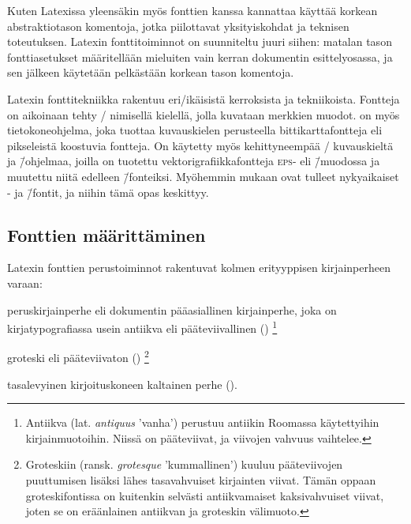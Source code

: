 Kuten Latexissa yleensäkin myös fonttien kanssa kannattaa käyttää
korkean abstraktiotason komentoja, jotka piilottavat yksityiskohdat ja
teknisen toteutuksen. Latexin fonttitoiminnot on suunniteltu juuri
siihen: matalan tason fonttiasetukset määritellään mieluiten vain kerran
dokumentin esittelyosassa, ja sen jälkeen käytetään pelkästään korkean
tason komentoja.

Latexin fonttitekniikka rakentuu eri\-/ikäisistä kerroksista ja
tekniikoista. Fontteja on aikoinaan tehty
\-/ nimisellä kielellä, jolla
kuvataan merkkien muodot.  on myös tietokoneohjelma,
joka tuottaa kuvauskielen perusteella bittikarttafontteja eli
pikseleistä koostuvia fontteja. On käytetty myös kehittyneempää
\-/ kuvauskieltä ja \=/ohjelmaa,
joilla on tuotettu vektorigrafiikkafontteja \textsc{eps}- eli
 \=/muodossa ja muutettu niitä
edelleen  \=/fonteiksi. Myöhemmin mukaan
ovat tulleet nykyaikaiset - ja 
\=/fontit, ja niihin tämä opas keskittyy.

\subsection{Fonttien määrittäminen}
\label{luku/fontin-valinta}

Latexin fonttien perustoiminnot rakentuvat kolmen erityyppisen
kirjainperheen varaan:

\begin{nluetelma}
\item peruskirjainperhe eli dokumentin pääasiallinen kirjainperhe, joka
  on kirjatypografiassa usein antiikva eli pääteviivallinen
  ()%
  \footnote{Antiikva (lat. \emph{antiquus} 'vanha') perustuu antiikin
    Roomassa käytettyihin kirjainmuotoihin. Niissä on pääteviivat, ja
    viivojen vahvuus vaihtelee.}
\item groteski eli pääteviivaton ()%
  \footnote{Groteskiin (ransk. \emph{grotesque} 'kummallinen') kuuluu
    pääteviivojen puuttumisen lisäksi lähes tasavahvuiset kirjainten
    viivat. Tämän oppaan groteskifontissa on kuitenkin selvästi
    antiikvamaiset kaksivahvuiset viivat, joten se on eräänlainen
    antiikvan ja groteskin välimuoto.}
\item tasalevyinen kirjoituskoneen kaltainen perhe
  ().
\end{nluetelma}

